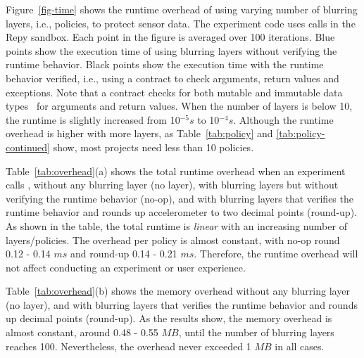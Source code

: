 Figure~\ref{fig-time} shows the runtime overhead of using varying number of 
blurring layers, i.e., policies, to protect sensor data. The experiment code 
uses calls  in the Repy sandbox. Each point in the 
figure is averaged over 100 iterations. Blue points show the execution time of 
using blurring layers without verifying the runtime behavior. Black points 
show the execution time with the runtime behavior verified, i.e., using a 
contract to check arguments, return values and exceptions. Note that a 
contract checks for both mutable and immutable data types~\cite{muta} 
for arguments and return values. When the number of layers is below 10, 
the runtime is slightly increased from 10$^{-5} s$ to 10$^{-4} s$. Although
the runtime overhead is higher with more layers, as Table~\ref{tab:policy} 
and \ref{tab:policy-continued} show, most projects need less than 10
policies. 

Table~\ref{tab:overhead}(a) shows the total runtime overhead when an experiment
calls , without any blurring layer (no layer), with blurring 
layers but without verifying the runtime behavior (no-op), and with blurring layers
that verifies the runtime behavior and rounds up accelerometer to two decimal 
points (round-up). As shown in the table, the total runtime is \textit{linear} with an 
increasing number of layers/policies. The overhead per policy is almost
constant, with no-op round 0.12 - 0.14 $ms$ and round-up 0.14 - 0.21 $ms$. 
Therefore, the runtime overhead will not affect conducting an 
experiment or user experience.

Table~\ref{tab:overhead}(b) shows the memory overhead without any blurring layer 
(no layer), and with blurring layers that verifies the runtime behavior and rounds up 
decimal points (round-up). As the results show, the memory overhead is almost
constant, around 0.48 - 0.55 $MB$, until the number of blurring layers reaches 100. 
 Nevertheless, the overhead never exceeded 1 
$MB$ in all cases. 

